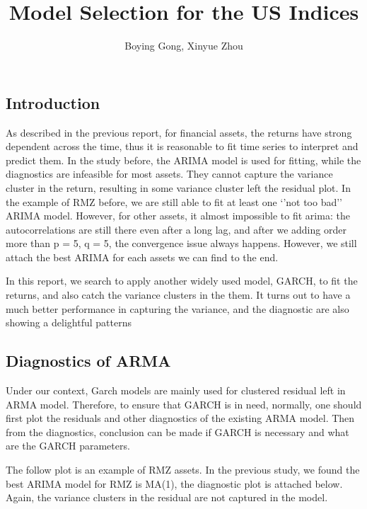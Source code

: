 \documentclass[12pt]{article}
\title{Model Selection for the US Indices}
\author{Boying Gong, Xinyue Zhou}
\begin{document}
\maketitle

\fi


\subsection{Introduction}
As described in the previous report, for financial assets, the returns have strong dependent across the time, thus it is reasonable to fit time series to interpret and predict them. In the study before,  the ARIMA model is used for fitting, while the diagnostics are infeasible for most assets. They cannot capture the variance cluster in the return, resulting in some variance cluster left the residual plot. In the example of RMZ  before, we are still able to fit at least one `'not too bad'' ARIMA model. However, for other assets, it almost impossible to fit arima: the autocorrelations are still there even after a long lag, and after we adding order more than p = 5, q = 5, the convergence issue always happens. However, we still attach the best ARIMA for each assets we can find to the end.

In this report, we search to apply another widely used model, GARCH,  to fit the returns, and also catch the variance clusters in the them. It turns out to have a much better performance in capturing the variance, and the diagnostic are also showing a delightful patterns

\subsection{Diagnostics of ARMA}
Under our context, Garch models are mainly used for clustered residual left in ARMA model. Therefore, to ensure that GARCH is in need, normally, one should first plot the residuals and other diagnostics of the existing ARMA model. Then from the diagnostics, conclusion can be made if GARCH is necessary and what are the GARCH parameters.

The follow plot is an example of RMZ assets. In the previous study, we found the best ARIMA model for RMZ is MA(1), the diagnostic plot is attached below. Again, the variance clusters in the residual are not captured in the model.
\end{document}
